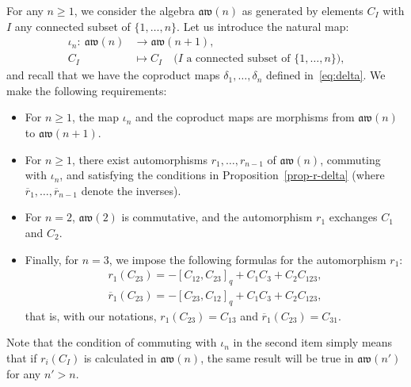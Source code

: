 \documentclass[10pt,a4paper]{amsart}
\numberwithin{equation}{section}
\theoremstyle{definition}
\newcommand{\rb}{\overline{r}}
\newcommand{\aw}{\mathfrak{aw}(n)}
\begin{document}
For any $n\geq 1$, we consider the algebra $\aw$ as generated by elements $C_I$ with $I$ any connected subset of $\{1,\dots,n\}$. Let us introduce the natural map:
\begin{align*} \iota_n\colon \ \aw & \to \mathfrak{aw}(n+1),\\
C_I & \mapsto C_I \quad \text{($I$ a connected subset of $\{1,\dots,n\}$),}
\end{align*}
and recall that we have the coproduct maps $\delta_1,\dots,\delta_n$ defined in~\eqref{eq:delta}. We make the following requirements:
\begin{itemize}\itemsep=0pt
\item[1.] For $n\geq 1$, the map $\iota_n$ and the coproduct maps are morphisms from $\mathfrak{aw}(n)$ to $\mathfrak{aw}(n+1)$.
\item[2.] For $n\geq 1$, there exist automorphisms $r_1,\dots,r_{n-1}$ of $\aw$, commuting with $\iota_n$, and satisfying the conditions in Proposition~\ref{prop-r-delta} (where $\rb_1,\dots,\rb_{n-1}$ denote the inverses).
\item[3.] For $n=2$, $\mathfrak{aw}(2)$ is commutative, and the automorphism $r_1$ exchanges $C_1$ and $C_2$.
\item[4.] Finally, for $n=3$, we impose the following formulas for the automorphism $r_1$:
\begin{gather}\label{axiomAW3}
r_1(C_{23})=-[C_{12},C_{23}]_q+C_1C_3+C_2C_{123}, \nonumber\\
\rb_1(C_{23})=-[C_{23},C_{12}]_q+C_1C_3+C_2C_{123} ,
\end{gather}
that is, with our notations, $r_1(C_{23})=C_{13}$ and $\rb_1(C_{23})=C_{31}$.
\end{itemize}
Note that the condition of commuting with $\iota_n$ in the second item simply means that if $r_i(C_I)$ is calculated in $\aw$, the same result will be true in $\mathfrak{aw}(n')$ for any $n'>n$.
\end{document}
